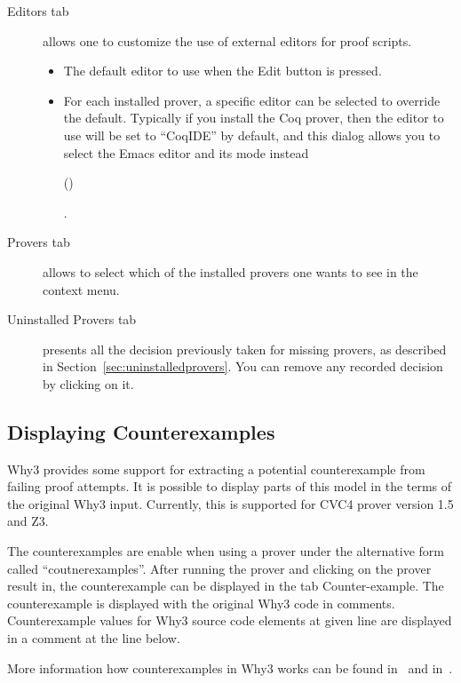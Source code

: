 \begin{description}
\item[\textsf{Editors} tab] allows one to customize the use
  of external editors for proof scripts.
\begin{itemize}
\item The default editor to use when the \textsf{Edit} button is
  pressed.
\item For each installed prover, a specific editor can be selected to
  override the default. Typically if you install the Coq prover, then
  the editor to use will be set to ``CoqIDE'' by default, and this
  dialog allows you to select the Emacs editor and its
  mode instead%
 \begin{latexonly} (\urlprfgen)\end{latexonly}.
\end{itemize}
\item[\textsf{Provers} tab]
  allows to select which of the installed provers one wants to see
  in the context menu.
\item[\textsf{Uninstalled Provers} tab] presents all the
  decision previously taken for missing provers, as described in
  Section~\ref{sec:uninstalledprovers}. You can remove any recorded
  decision by clicking on it.
\end{description}

\subsection{Displaying Counterexamples}

Why3 provides some support for extracting a potential counterexample
from failing proof attempts. It is possible to display parts of this
model in the terms of the original Why3 input.  Currently, this is
supported for CVC4 prover version 1.5 and Z3.

The counterexamples are enable when using a prover under the
alternative form called ``coutnerexamples''. After running the prover
and clicking on the prover result in, the counterexample can be
displayed in the tab Counter-example.  The counterexample is displayed
with the original Why3 code in comments.  Counterexample values for
Why3 source code elements at given line are displayed in a comment at
the line below.

More information how counterexamples in Why3 works can be found
in~\cite{hauzar16sefm} and in~\cite{dailler18jlamp}.


%
%
%
%
%
%



